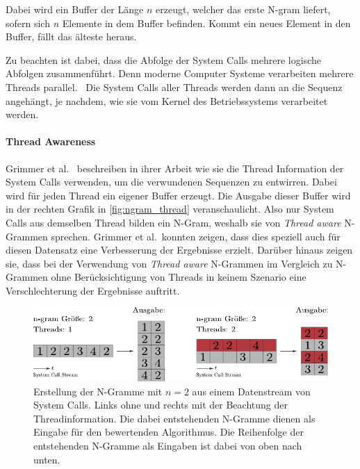             Dabei wird ein Buffer der Länge $n$ erzeugt, welcher das erste N-gram liefert, sofern sich $n$ Elemente in dem Buffer befinden.
            Kommt ein neues Element in den Buffer, fällt das älteste heraus.\par\medskip

            Zu beachten ist dabei, dass die Abfolge der System Calls mehrere logische Abfolgen zusammenführt.
            Denn moderne Computer Systeme verarbeiten mehrere Threads parallel.~\cite{SYSCALL_SILBERSCHATZ}
            Die System Calls aller Threads werden dann an die Sequenz angehängt, je nachdem, wie sie vom Kernel des Betriebssystems verarbeitet werden.
            
            \paragraph{Thread Awareness}
                Grimmer et al.~\cite{IDSTHREADGRIMMER2021} beschreiben in ihrer Arbeit wie sie die Thread Information der System Calls verwenden, um die verwundenen Sequenzen zu entwirren.
                Dabei wird für jeden Thread ein eigener Buffer erzeugt. 
                Die Ausgabe dieser Buffer wird in der rechten Grafik in \autoref{fig:ngram_thread} veranschaulicht. 
            Also nur System Calls aus demselben Thread bilden ein N-Gram, weshalb sie von \textit{Thread aware} N-Grammen sprechen.
                Grimmer et al.\ konnten zeigen, dass dies speziell auch für diesen Datensatz eine Verbesserung der Ergebnisse erzielt.
                Darüber hinaus zeigen sie, dass bei der Verwendung von \textit{Thread aware} N-Grammen im Vergleich zu N-Grammen ohne Berücksichtigung von Threads in keinem Szenario eine Verschlechterung der Ergebnisse auftritt.

                \begin{figure}
                    \includegraphics[width=\textwidth]{images/ngram.pdf}
                    \caption[Erstellung N-Gramme]{Erstellung der N-Gramme mit $n=2$ aus einem Datenstream von System Calls.
                        Links ohne und rechts mit der Beachtung der Threadinformation.
                        Die dabei entstehenden N-Gramme dienen als Eingabe für den bewertenden Algorithmus.
                        Die Reihenfolge der entstehenden N-Gramme als Eingaben ist dabei von oben nach unten.
                    }\label{fig:ngram_thread}
                \end{figure}

